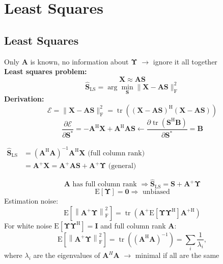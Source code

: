 \documentclass[english]{latex4ei/latex4ei_sheet}
\begin{document}
\pagebreak
\section{Least Squares}
\begin{sectionbox}
  \subsection{Least Squares}
  Only $\boldsymbol{A}$ is known, no information about $\boldsymbol{\Upsilon}$ $\rightarrow$ ignore it all together\\
  \textbf{Least squares problem:}\\
  $$\boldsymbol{X} \approx \boldsymbol{A} \boldsymbol{S}$$
  $$\hat{\boldsymbol{S}}_{\mathrm{LS}}=\arg \min _{\boldsymbol{S}}\|\boldsymbol{X}-\boldsymbol{A S}\|_{\mathrm{F}}^{2}$$
  \textbf{Derivation:}
  $$\mathcal{E}=\|\boldsymbol{X}-\boldsymbol{A} \boldsymbol{S}\|_{\mathrm{F}}^{2}=\operatorname{tr}\left((\boldsymbol{X}-\boldsymbol{A} \boldsymbol{S})^{\mathrm{H}}(\boldsymbol{X}-\boldsymbol{A} \boldsymbol{S})\right)$$
  $$\frac{\partial \mathcal{E}}{\partial \boldsymbol{S}^{*}}=-\boldsymbol{A}^{\mathrm{H}} \boldsymbol{X}+\boldsymbol{A}^{\mathrm{H}} \boldsymbol{A} \boldsymbol{S} \leftarrow \frac{\partial \operatorname{tr}\left(\boldsymbol{S}^{\mathrm{H}} \boldsymbol{B}\right)}{\partial \boldsymbol{\boldsymbol{S}}^{*}} = \boldsymbol{B}$$

  \begin{emphbox}
    $\begin{aligned}
      \hat{\boldsymbol{S}}_{\mathrm{LS}} &=\left(\boldsymbol{A}^{\mathrm{H}} \boldsymbol{A}\right)^{-1} \boldsymbol{A}^{\mathrm{H}} \boldsymbol{X} \text{ (full column rank)}\\
      &=\boldsymbol{A}^{+} \boldsymbol{X} = \boldsymbol{A}^{+} \boldsymbol{A} \boldsymbol{S}+\boldsymbol{A}^{+} \boldsymbol{\Upsilon}\text{ (general)}
      \end{aligned}$
  \end{emphbox}
  $$\boldsymbol{A} \text { has full column rank } \Longrightarrow \hat{\boldsymbol{S}}_{\mathrm{LS}}=\boldsymbol{S}+\boldsymbol{A}^{+} \boldsymbol{\Upsilon}$$
  $$\mathrm{E}[\boldsymbol{\Upsilon}]=\mathbf{0}\Longrightarrow \text{ unbiased}$$
  Estimation noise:\\
  $$\mathrm{E}\left[\left\|\boldsymbol{A}^{+} \boldsymbol{\Upsilon}\right\|_{\mathrm{F}}^{2}\right] = \operatorname{tr}\left(\boldsymbol{A}^{+} \mathrm{E}\left[\boldsymbol{\Upsilon} \boldsymbol{\Upsilon}^{\mathrm{H}}\right] \boldsymbol{A}^{+\mathrm{H}}\right)$$
  For white noise $\mathrm{E}\left[\boldsymbol{\Upsilon} \boldsymbol{\Upsilon}^{\mathrm{H}}\right]=\mathbf{I}$ and full column rank $\boldsymbol{A}$:\\
  $$\mathrm{E}\left[\left\|\boldsymbol{A}^{+} \boldsymbol{\Upsilon}\right\|_{\mathrm{F}}^{2}\right] = \operatorname{tr}\left(\left(\boldsymbol{A}^{\mathrm{H}} \boldsymbol{A}\right)^{-1}\right) = \sum_{i} \frac{1}{\lambda_{i}},$$
  where $\lambda_i$ are the eigenvalues of $\boldsymbol{A}^H\boldsymbol{A}$ $\rightarrow$ minimal if all are the same\\


\end{sectionbox}
\end{document}
